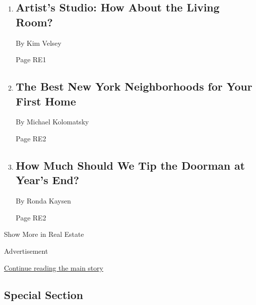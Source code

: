 \begin{enumerate}
\def\labelenumi{\arabic{enumi}.}
\item
  \href{/2019/11/29/realestate/artists-working-from-home.html}{}

  \hypertarget{artists-studio-how-about-the-living-room}{%
  \subsection{Artist's Studio: How About the Living
  Room?}\label{artists-studio-how-about-the-living-room}}

  By Kim Velsey

  Page RE1
\item
  \href{/2019/11/28/realestate/the-best-new-york-neighborhoods-for-your-first-home.html}{}

  \hypertarget{the-best-new-york-neighborhoods-for-your-first-home}{%
  \subsection{The Best New York Neighborhoods for Your First
  Home}\label{the-best-new-york-neighborhoods-for-your-first-home}}

  By Michael Kolomatsky

  Page RE2
\item
  \href{/2019/11/30/realestate/how-much-should-I-tip-the-doorman-for-the-holidays.html}{}

  \hypertarget{how-much-should-we-tip-the-doorman-at-years-end}{%
  \subsection{How Much Should We Tip the Doorman at Year's
  End?}\label{how-much-should-we-tip-the-doorman-at-years-end}}

  By Ronda Kaysen

  Page RE2
\end{enumerate}

Show More in Real Estate

Advertisement

\protect\hyperlink{after-mid8}{Continue reading the main story}

\hypertarget{special-section}{%
\subsection{Special Section}\label{special-section}}

